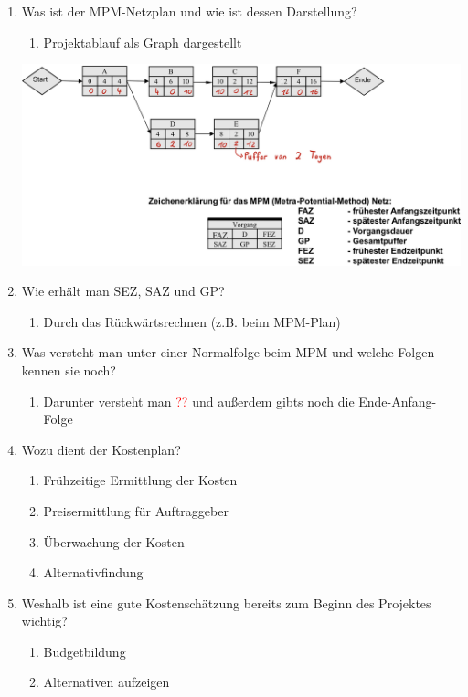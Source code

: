 \documentclass[12pt,a4paper]{article}
\begin{document}
\begin{enumerate}
\begin{center}
	\end{center}
	\item Was ist der MPM-Netzplan und wie ist dessen Darstellung?
	\begin{enumerate}
		\item Projektablauf als Graph dargestellt
	\end{enumerate}
	\begin{center}
		\includegraphics[scale=.175]{Bilder/MPM.JPG}	
	\end{center}
	\item Wie erhält man SEZ, SAZ und GP?
	\begin{enumerate}
		\item Durch das Rückwärtsrechnen (z.B. beim MPM-Plan)
	\end{enumerate}
	\item Was versteht man unter einer Normalfolge beim MPM und welche Folgen kennen sie noch?
	\begin{enumerate}
		\item Darunter versteht man \textcolor{red}{??} und außerdem gibts noch die Ende-Anfang-Folge
	\end{enumerate}
	\item Wozu dient der Kostenplan?
	\begin{enumerate}
		\item Frühzeitige Ermittlung der Kosten
		\item Preisermittlung für Auftraggeber
		\item Überwachung der Kosten
		\item Alternativfindung
	\end{enumerate}
	\item Weshalb ist eine gute Kostenschätzung bereits zum Beginn des Projektes wichtig?
	\begin{enumerate}
		\item Budgetbildung 
		\item Alternativen aufzeigen

\end{enumerate}
\end{enumerate}
\end{document}
